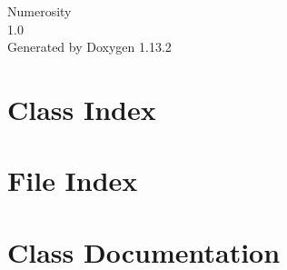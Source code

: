 \documentclass[twoside]{book}
\newcommand{\+}{\discretionary{\mbox{\scriptsize$\hookleftarrow$}}{}{}}
\newcommand{\clearemptydoublepage}{%
    \newpage{\pagestyle{empty}\cleardoublepage}%
  }
\begin{document}
  \raggedbottom
    \hypersetup{pageanchor=false,
                bookmarksnumbered=true,
                pdfencoding=unicode
               }
  \begin{titlepage}
  \vspace*{7cm}
  \begin{center}%
  {\Large Numerosity}\\
  [1ex]\large 1.\+0 \\
  \vspace*{1cm}
  {\large Generated by Doxygen 1.13.2}\\
  \end{center}
  \end{titlepage}
  \clearemptydoublepage
  \tableofcontents
  \clearemptydoublepage
  \hypersetup{pageanchor=true}
\chapter{Class Index}

\chapter{File Index}

\chapter{Class Documentation}












\end{document}
